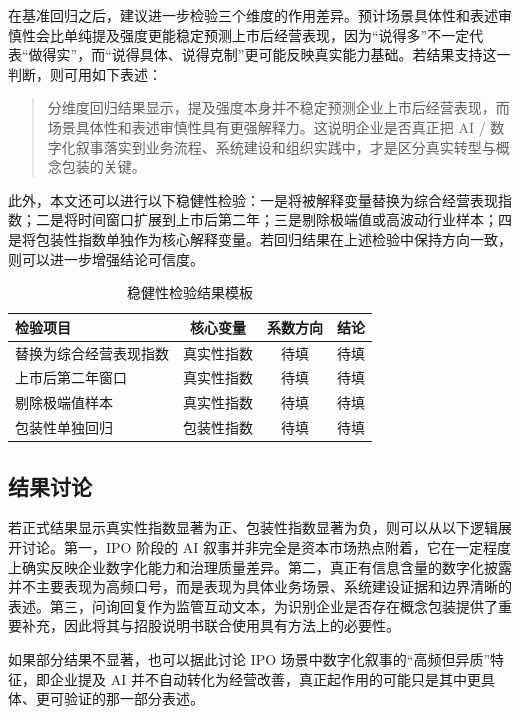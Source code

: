 在基准回归之后，建议进一步检验三个维度的作用差异。预计场景具体性和表述审慎性会比单纯提及强度更能稳定预测上市后经营表现，因为“说得多”不一定代表“做得实”，而“说得具体、说得克制”更可能反映真实能力基础。若结果支持这一判断，则可用如下表述：

\begin{quote}
分维度回归结果显示，提及强度本身并不稳定预测企业上市后经营表现，而场景具体性和表述审慎性具有更强解释力。这说明企业是否真正把 AI / 数字化叙事落实到业务流程、系统建设和组织实践中，才是区分真实转型与概念包装的关键。
\end{quote}

此外，本文还可以进行以下稳健性检验：一是将被解释变量替换为综合经营表现指数；二是将时间窗口扩展到上市后第二年；三是剔除极端值或高波动行业样本；四是将包装性指数单独作为核心解释变量。若回归结果在上述检验中保持方向一致，则可以进一步增强结论可信度。

\begin{table}[H]
\centering
\caption{稳健性检验结果模板}
\begin{tabular}{lccc}
\toprule
检验项目 & 核心变量 & 系数方向 & 结论 \\
\midrule
替换为综合经营表现指数 & 真实性指数 & 待填 & 待填 \\
上市后第二年窗口 & 真实性指数 & 待填 & 待填 \\
剔除极端值样本 & 真实性指数 & 待填 & 待填 \\
包装性单独回归 & 包装性指数 & 待填 & 待填 \\
\bottomrule
\end{tabular}
\end{table}

\subsection{结果讨论}

若正式结果显示真实性指数显著为正、包装性指数显著为负，则可以从以下逻辑展开讨论。第一，IPO 阶段的 AI 叙事并非完全是资本市场热点附着，它在一定程度上确实反映企业数字化能力和治理质量差异。第二，真正有信息含量的数字化披露并不主要表现为高频口号，而是表现为具体业务场景、系统建设证据和边界清晰的表述。第三，问询回复作为监管互动文本，为识别企业是否存在概念包装提供了重要补充，因此将其与招股说明书联合使用具有方法上的必要性。

如果部分结果不显著，也可以据此讨论 IPO 场景中数字化叙事的“高频但异质”特征，即企业提及 AI 并不自动转化为经营改善，真正起作用的可能只是其中更具体、更可验证的那一部分表述。

